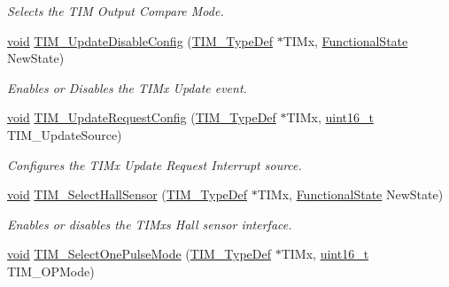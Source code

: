\begin{DoxyCompactItemize}
\begin{DoxyCompactList}\small\item\em Selects the T\+IM Output Compare Mode. \end{DoxyCompactList}\item 
\hyperlink{usb__devapi_8h_afabf60e7f57651d6d595a02c75f07cd0}{void} \hyperlink{group___t_i_m___exported___functions_gace2384dd33e849a054f61b8e1fc7e7c3}{T\+I\+M\+\_\+\+Update\+Disable\+Config} (\hyperlink{struct_t_i_m___type_def}{T\+I\+M\+\_\+\+Type\+Def} $\ast$T\+I\+Mx, \hyperlink{agilefox_2library_2inc_2stm32f10x__type_8h_ac9a7e9a35d2513ec15c3b537aaa4fba1}{Functional\+State} New\+State)
\begin{DoxyCompactList}\small\item\em Enables or Disables the T\+I\+Mx Update event. \end{DoxyCompactList}\item 
\hyperlink{usb__devapi_8h_afabf60e7f57651d6d595a02c75f07cd0}{void} \hyperlink{group___t_i_m___exported___functions_ga1d7a8f952e209de142499e67a653fc1f}{T\+I\+M\+\_\+\+Update\+Request\+Config} (\hyperlink{struct_t_i_m___type_def}{T\+I\+M\+\_\+\+Type\+Def} $\ast$T\+I\+Mx, \hyperlink{_p_e___types_8h_a1f1825b69244eb3ad2c7165ddc99c956}{uint16\+\_\+t} T\+I\+M\+\_\+\+Update\+Source)
\begin{DoxyCompactList}\small\item\em Configures the T\+I\+Mx Update Request Interrupt source. \end{DoxyCompactList}\item 
\hyperlink{usb__devapi_8h_afabf60e7f57651d6d595a02c75f07cd0}{void} \hyperlink{group___t_i_m___exported___functions_ga42c2d1025a3937c9d9f38631af86ffa4}{T\+I\+M\+\_\+\+Select\+Hall\+Sensor} (\hyperlink{struct_t_i_m___type_def}{T\+I\+M\+\_\+\+Type\+Def} $\ast$T\+I\+Mx, \hyperlink{agilefox_2library_2inc_2stm32f10x__type_8h_ac9a7e9a35d2513ec15c3b537aaa4fba1}{Functional\+State} New\+State)
\begin{DoxyCompactList}\small\item\em Enables or disables the T\+I\+Mx\textquotesingle{}s Hall sensor interface. \end{DoxyCompactList}\item 
\hyperlink{usb__devapi_8h_afabf60e7f57651d6d595a02c75f07cd0}{void} \hyperlink{group___t_i_m___exported___functions_gadd2cca5fac6c1291dc4339098d5c9562}{T\+I\+M\+\_\+\+Select\+One\+Pulse\+Mode} (\hyperlink{struct_t_i_m___type_def}{T\+I\+M\+\_\+\+Type\+Def} $\ast$T\+I\+Mx, \hyperlink{_p_e___types_8h_a1f1825b69244eb3ad2c7165ddc99c956}{uint16\+\_\+t} T\+I\+M\+\_\+\+O\+P\+Mode)

\end{DoxyCompactItemize}
